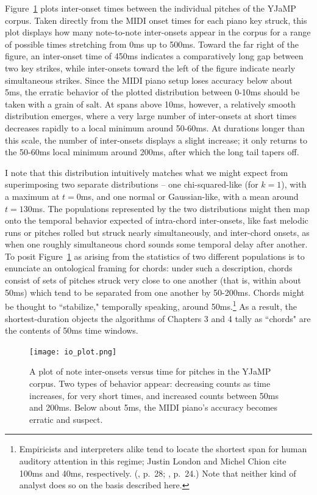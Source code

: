 Figure~\ref{io_plot} plots inter-onset times between the individual pitches of the YJaMP corpus.  Taken directly from the MIDI onset times for each piano key struck, this plot displays how many note-to-note inter-onsets appear in the corpus for a range of possible times stretching from 0ms up to 500ms.  Toward the far right of the figure, an inter-onset time of 450ms indicates a comparatively long gap between two key strikes, while inter-onsets toward the left of the figure indicate nearly simultaneous strikes.  Since the MIDI piano setup loses accuracy below about 5ms, the erratic behavior of the plotted distribution between 0-10ms should be taken with a grain of salt.  At spans above 10ms, however, a relatively smooth distribution emerges, where a very large number of inter-onsets at short times decreases rapidly to a local minimum around 50-60ms.  At durations longer than this scale, the number of inter-onsets displays a slight increase; it only returns to the 50-60ms local minimum around 200ms, after which the long tail tapers off.

I note that this distribution intuitively matches what we might expect from superimposing two separate distributions -- one chi-squared-like (for $k=1$), with a maximum at $t=0$ms, and one normal or Gaussian-like, with a mean around $t=130$ms.  The populations represented by the two distributions might then map onto the temporal behavior expected of intra-chord inter-onsets, like fast melodic runs or pitches rolled but struck nearly simultaneously, and inter-chord onsets, as when one roughly simultaneous chord sounds some temporal delay after another.  To posit Figure~\ref{io_plot} as arising from the statistics of two different populations is to enunciate an ontological framing for chords: under such a description, chords consist of sets of pitches struck very close to one another (that is, within about 50ms) which tend to be separated from one another by 50-200ms.  Chords might be thought to ``stabilize," temporally speaking, around 50ms.\footnote{Empiricists and interpreters alike tend to locate the shortest span for human auditory attention in this regime; Justin London and Michel Chion cite 100ms and 40ms, respectively. (\cite{london2012}, p.\ 28; \cite{chion2016}, p.\ 24.)  Note that neither kind of analyst does so on the basis described here.}  As a result, the shortest-duration objects the algorithms of Chapters 3 and 4 tally as ``chords" are the contents of 50ms time windows.

\begin{figure}
	\centering
	\caption{A plot of note inter-onsets versus time for pitches in the YJaMP corpus.  Two types of behavior appear: decreasing counts as time increases, for very short times, and increased counts between 50ms and 200ms.  Below about 5ms, the MIDI piano's accuracy becomes erratic and suspect.}
	\label{io_plot}
	\texttt{[image: io\_plot.png]}
\end{figure}

